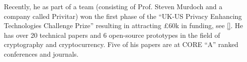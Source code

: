 Recently, he as part of a team (consisting of Prof. Steven Murdoch and a company called Privitar) won the first phase of the “UK-US Privacy Enhancing Technologies Challenge Prize” resulting in attracting £60k in funding, see \href{https://www.ucl.ac.uk/computer-science/news/2022/dec/ucl-computer-sciences-success-privacy-enhancing-technologies-challenge}{[\x]}.  He has over 20 technical papers and 6 open-source prototypes in the field of cryptography and cryptocurrency. Five of his papers are at CORE “A” ranked conferences and journals.




